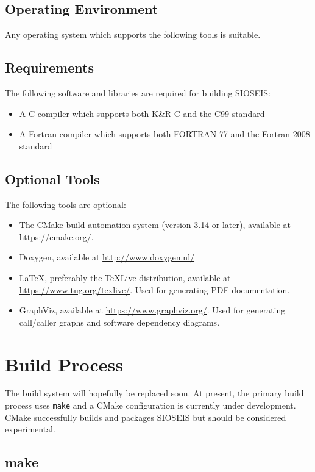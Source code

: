 \section{Operating Environment}
Any operating system which supports the following tools is suitable.

\section{Requirements}
The following software and libraries are required for building SIOSEIS:

\begin{itemize}
    \item A C compiler which supports both K\&R C and the C99 standard
    \item A Fortran compiler which supports both FORTRAN 77 and the Fortran 2008 standard
\end{itemize}

\section{Optional Tools}
The following tools are optional:

\begin{itemize}
    \item The CMake build automation system (version 3.14 or later), available at \url{https://cmake.org/}.
    \item Doxygen, available at \url{http://www.doxygen.nl/}
    \item LaTeX, preferably the TeXLive distribution, available at \url{https://www.tug.org/texlive/}. Used for generating PDF documentation.
    \item GraphViz, available at \url{https://www.graphviz.org/}. Used for generating call/caller graphs and software dependency diagrams.
\end{itemize}

\chapter{Build Process}

The build system will hopefully be replaced soon. At present, the primary build
process uses \texttt{make} and a CMake configuration is currently under
development. CMake successfully builds and packages SIOSEIS but should be
considered experimental.

\section{make}

